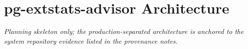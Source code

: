 \section{pg-extstats-advisor Architecture}
\textit{Planning skeleton only; the production-separated architecture is
anchored to the system repository evidence listed in the provenance notes.}

